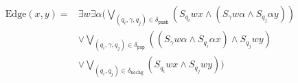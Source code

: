 \documentclass[10pt]{homework}
\begin{document}
\[
\begin{array}{lll}
	\text{Edge}(x,y) = & \exists w \exists \alpha( \bigvee\limits_{(q_i, \gamma, q_j) \in \delta_\mathtt{push}} (S_{q_i} w x \land (S_\gamma w \alpha \land S_{q_j} \alpha y))\\
	                   & \lor \bigvee\limits_{(q_i, \gamma, q_j) \in \delta_\mathtt{pop}} ((S_\gamma w \alpha \land S_{q_i} \alpha x) \land S_{q_j} w y)\\
	                   & \lor \bigvee\limits_{(q_i, q_j) \in \delta_\mathtt{nochg}} (S_{q_i} w x \land S_{q_j} w y) )\\
\end{array}
\]
\end{document}
